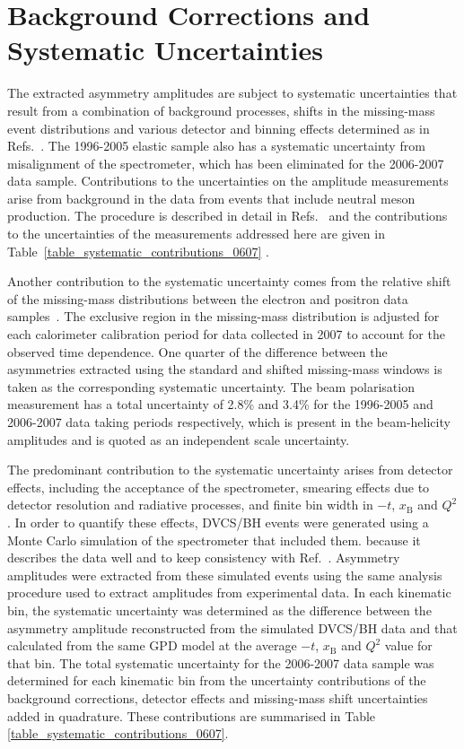 \section{Background Corrections and Systematic Uncertainties}
The extracted asymmetry amplitudes are subject to systematic uncertainties that
result from a combination of background processes, 
shifts in the missing-mass event distributions and various detector and binning
effects determined as in Refs.~\cite{Air08,Air09}. The
1996-2005 elastic sample also has a systematic uncertainty from misalignment of the spectrometer, which has been eliminated for the 2006-2007 data sample. Contributions to the uncertainties on the amplitude measurements arise from background in the data from events that include neutral meson production. The procedure is described in detail in Refs.~\cite{Air08,Air09} and the contributions to the uncertainties of the measurements addressed here are given in Table~\ref{table_systematic_contributions_0607} . 

Another contribution to the systematic uncertainty comes from the relative shift of the
missing-mass distributions between the electron and positron data
samples~\cite{Zei09,Bur10}. The exclusive region in the missing-mass
distribution is adjusted for each calorimeter calibration period for data
collected in 2007 to account for the observed time dependence. One
quarter of the difference between the asymmetries extracted using the standard
and shifted missing-mass windows is taken as the corresponding systematic
uncertainty. The beam polarisation measurement has a total uncertainty of 2.8\% and 3.4\% for the 1996-2005 and 2006-2007 data taking periods respectively,
which is present in the beam-helicity amplitudes and is quoted as an
independent scale uncertainty.

The predominant contribution to the systematic uncertainty arises from detector
effects, including the acceptance of the spectrometer, smearing effects due to detector resolution and radiative processes, and
finite bin width in $-t$, $x_{\textrm{B}}$ and $Q^{2}$. In order to quantify
these effects, DVCS/BH events were generated using a Monte Carlo simulation of
the spectrometer that included them.  because it describes the data well and to keep consistency with Ref.~\cite{Air09}. Asymmetry amplitudes were extracted from these simulated events using the same analysis
procedure used to extract amplitudes from experimental data. In each kinematic
bin, the systematic uncertainty was determined as the difference between the
asymmetry amplitude reconstructed from the simulated DVCS/BH data and that
calculated from the same GPD model at the average $-t$, $x_{\textrm{B}}$ and
$Q^{2}$ value for that bin.
The total systematic uncertainty for the 2006-2007 data sample was
determined for each kinematic bin from the uncertainty contributions of the
background corrections, detector effects and missing-mass shift
uncertainties added in quadrature. These contributions are summarised in Table
\ref{table_systematic_contributions_0607}.

